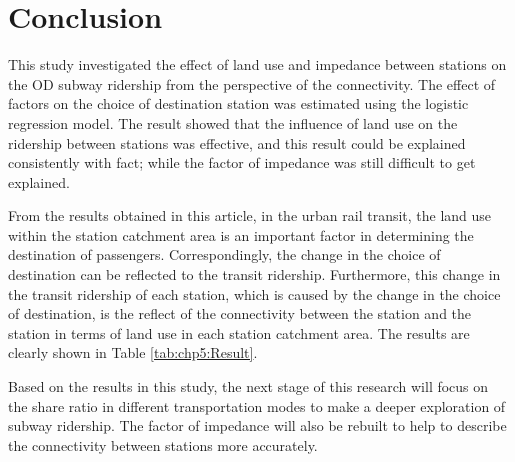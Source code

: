 %
\section{Conclusion}
%
This study investigated the effect of land use and impedance between stations on the OD subway ridership from the perspective of the connectivity. The effect of factors on the choice of destination station was estimated using the logistic regression model. The result showed that the influence of land use on the ridership between stations was effective, and this result could be explained consistently with fact; while the factor of impedance was still difficult to get explained.

%
From the results obtained in this article, in the urban rail transit, the land use within the station catchment area is an important factor in determining the destination of passengers. Correspondingly, the change in the choice of destination can be reflected to the transit ridership. Furthermore, this change in the transit ridership of each station, which is caused by the change in the choice of destination, is the reflect of the connectivity between the station and the station in terms of land use in each station catchment area. The results are clearly shown in Table \ref{tab:chp5:Result}.

%
Based on the results in this study, the next stage of this research will focus on the share ratio in different transportation modes to make a deeper exploration of subway ridership. The factor of impedance will also be rebuilt to help to describe the connectivity between stations more accurately.

\clearpage %

% 
